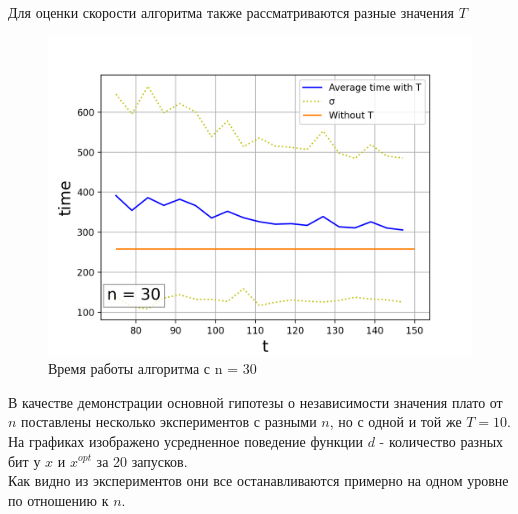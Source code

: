 \documentclass[times,specification,annotation]{itmo-student-thesis}
\begin{document}
    Для оценки скорости алгоритма также рассматриваются разные значения $T$
    \begin{figure}[H]
        \centering
        \caption{Время работы алгоритма с n = 30}
        \label{pic:sublists-metafile}
        \includegraphics[scale=0.8]{plot_time_30_as_30.png}
    \end{figure}


    В качестве демонстрации основной гипотезы о независимости значения плато от $n$ поставлены несколько экспериментов с разными $n$, но с одной и той же $T = 10$. \\
    На графиках изображено усредненное поведение функции $d$ - количество разных бит у $x$ и $x^{opt}$ за 20 запусков. \\
    Как видно из экспериментов они все останавливаются примерно на одном уровне по отношению к $n$. \\
\end{document}
